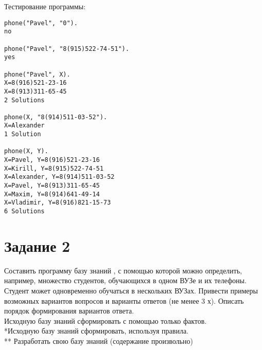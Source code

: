 Тестирование программы:\\
\begin{lstlisting}
phone("Pavel", "0").
no

phone("Pavel", "8(915)522-74-51"). 
yes

phone("Pavel", X).
X=8(916)521-23-16
X=8(913)311-65-45
2 Solutions	

phone(X, "8(914)511-03-52").
X=Alexander
1 Solution  

phone(X, Y).
X=Pavel, Y=8(916)521-23-16
X=Kirill, Y=8(915)522-74-51
X=Alexander, Y=8(914)511-03-52
X=Pavel, Y=8(913)311-65-45
X=Maxim, Y=8(914)641-49-14
X=Vladimir, Y=8(916)821-15-73
6 Solutions
\end{lstlisting}

\section{Задание 2}
Составить программу базу знаний , с помощью которой можно определить, например, множество студентов, обучающихся в одном ВУЗе и их телефоны. Студент может одновременно обучаться в нескольких ВУЗах. Привести примеры возможных вариантов вопросов и варианты ответов (не менее 3 х). Описать порядок формирования вариантов ответа.\\
Исходную базу знаний сформировать с помощью только фактов.\\
*Исходную базу знаний сформировать, используя правила.\\
** Разработать свою базу знаний (содержание произвольно)\\

